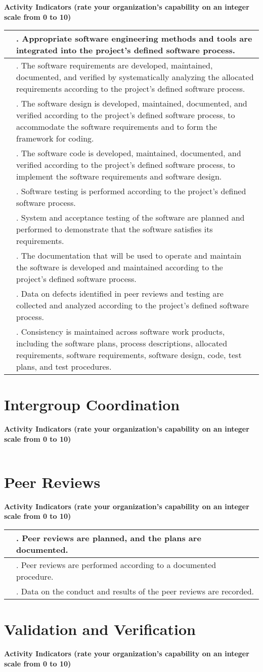 \documentclass{article}
\renewcommand{\thesection}
{%
    KPA.%
    \ifnum \value{section}<10 0\fi%
    \arabic{section}%
}
\newcounter{activity}
\newenvironment{KPAActivity}
	{
	 \setcounter{activity}{0}
	 {\bf Activity Indicators (rate your organization's capability
	 on an integer scale from 0 to 10)}
	 \begin{center}
	 \begin{tabular}{|p{0.5in}|p{6.0in}|} \hline
	}
	{
	 \end{tabular}
	 \end{center}
	}
\newcommand{\Activity}[2]{\stepcounter{activity} #1 &
\arabic{activity}. #2 \\ \hline}
\begin{document}
\begin{KPAActivity}
\Activity{}{Appropriate software engineering methods and tools are
integrated into the project's defined software process.}
\Activity{}{The software requirements are developed, maintained,
documented, and verified by systematically analyzing the allocated
requirements according to the project's defined software process.}
\Activity{}{The software design is developed, maintained, documented,
and verified according to the project's defined software process, to
accommodate the software requirements and to form the framework for
coding.}
\Activity{}{The software code is developed, maintained, documented,
and verified according to the project's defined software process, to
implement the software requirements and software design.}
\Activity{}{Software testing is performed according to the project's
defined software process.}
\Activity{}{System and acceptance testing of the software are planned
and performed to demonstrate that the software satisfies its
requirements.}
\Activity{}{The documentation that will be used to operate and
maintain the software is developed and maintained according to the
project's defined software process.}
\Activity{}{Data on defects identified in peer reviews and testing are
collected and analyzed according to the project's defined software
process.}
\Activity{}{Consistency is maintained across software work products,
including the software plans, process descriptions, allocated
requirements, software requirements, software design, code, test
plans, and test procedures.}
\end{KPAActivity}

\newpage
\section{Intergroup Coordination}

\begin{KPAActivity}

\end{KPAActivity}

\newpage
\section{Peer Reviews}

\begin{KPAActivity}
\Activity{}{Peer reviews are planned, and the plans are documented.}
\Activity{}{Peer reviews are performed according to a documented
procedure.}
\Activity{}{Data on the conduct and results of the peer reviews are
recorded.} 
\end{KPAActivity}

\newpage
\renewcommand{\thesection}{ASCI KPA}
\section{Validation and Verification}

\begin{KPAActivity}

\end{KPAActivity}
\end{document}
